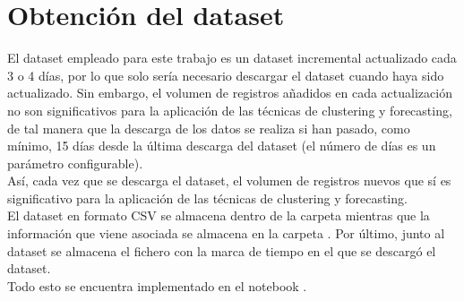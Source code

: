
\section{Obtención del dataset}

El dataset empleado para este trabajo es un dataset incremental actualizado cada 3 o 4 días, por lo que solo sería necesario descargar el dataset cuando haya sido actualizado. Sin embargo, el volumen de registros añadidos en cada actualización no son significativos para la aplicación de las técnicas de clustering y forecasting, de tal manera que la descarga de los datos se realiza si han pasado, como mínimo, 15 días desde la última descarga del dataset (el número de días es un parámetro configurable). \\

Así, cada vez que se descarga el dataset, el volumen de registros nuevos que sí es significativo para la aplicación de las técnicas de clustering y forecasting. \\

El dataset en formato CSV se almacena dentro de la carpeta  mientras que la información que viene asociada \citep{dataset} se almacena en la carpeta . Por último, junto al dataset se almacena el fichero  con la marca de tiempo en el que se descargó el dataset. \\

Todo esto se encuentra implementado en el notebook  \citep{master}.
